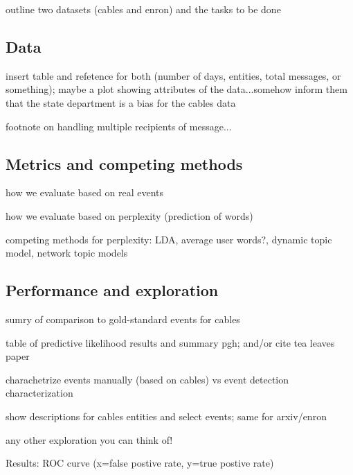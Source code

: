 \PP outline two datasets (cables and enron) and the tasks to be done

\subsection{Data}




\PP insert table and refetence for both (number of days, entities, total messages, or something); maybe a plot showing attributes of the data...somehow inform them that the state department is a bias for the cables data

\PP footnote on handling multiple recipients of message...

\subsection{Metrics and competing methods}

\PP how we evaluate based on real events

\PP how we evaluate based on perplexity (prediction of words)

\PP competing methods for perplexity: LDA, average user words?, dynamic topic model, network topic models

\subsection{Performance and exploration}

\PP sumry of comparison to gold-standard events for cables

\PP table of predictive likelihood results and summary pgh; and/or cite tea leaves paper


\PP charachetrize events manually (based on cables) vs event detection characterization

\PP show descriptions for cables entities and select events; same for arxiv/enron

\PP any other exploration you can think of!


Results: ROC curve (x=false postive rate, y=true postive rate)